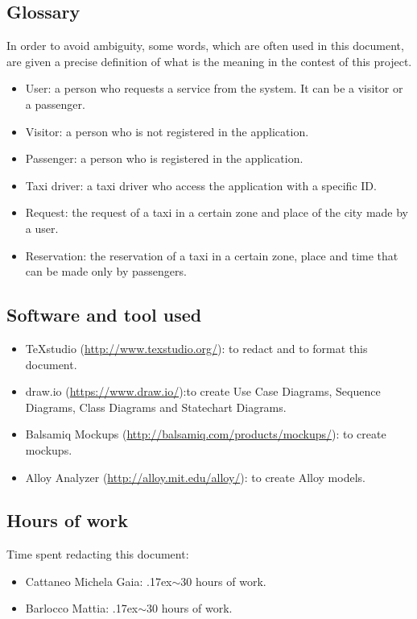 \documentclass[18pt,oneside,a4paper, titlepage]{article}
\begin{document}
	\subsection{Glossary}
		In order to avoid ambiguity, some words, which are often used in this document, are given a precise definition of what is the meaning in the contest of this project.
		\begin{itemize}
			\item User: a person who requests a service from the system. It can be a visitor or a passenger.
			\item Visitor: a person who is not registered in the application.
			\item Passenger: a person who is registered in the application.
			\item Taxi driver: a taxi driver who access the application with a specific ID.
			\item Request: the request of a taxi in a certain zone and place of the city made by a user.
			\item Reservation: the reservation of a taxi in a certain zone, place and time that can be made only by passengers.
	\end{itemize}
	\subsection{Software and tool used}
		\begin{itemize}
			\item TeXstudio (\url{http://www.texstudio.org/}): to redact and to format this document.
			\item draw.io (\url{https://www.draw.io/}):to create Use Case Diagrams, Sequence Diagrams, Class Diagrams and Statechart Diagrams.
			\item Balsamiq Mockups (\url{http://balsamiq.com/products/mockups/}): to create mockups.
			\item Alloy Analyzer (\url{http://alloy.mit.edu/alloy/}): to create Alloy models.
		\end{itemize}
	
	\subsection{Hours of work}
		Time spent redacting this document:
		\begin{itemize}
			\item Cattaneo Michela Gaia: {\raise.17ex\hbox{$\scriptstyle\sim$}}30 hours of work.
			\item Barlocco Mattia: {\raise.17ex\hbox{$\scriptstyle\sim$}}30 hours of work.
		\end{itemize}
\end{document}
